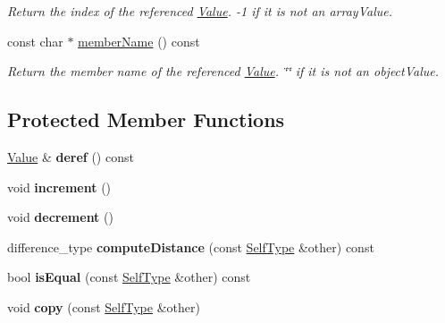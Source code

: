 \begin{DoxyCompactItemize}
\begin{DoxyCompactList}\small\item\em Return the index of the referenced \hyperlink{class_json_1_1_value}{Value}. -\/1 if it is not an array\-Value. \end{DoxyCompactList}\item 
\hypertarget{class_json_1_1_value_iterator_base_a83768d87c608c8d1133de8721eefc31b}{const char $\ast$ \hyperlink{class_json_1_1_value_iterator_base_a83768d87c608c8d1133de8721eefc31b}{member\-Name} () const }\label{class_json_1_1_value_iterator_base_a83768d87c608c8d1133de8721eefc31b}

\begin{DoxyCompactList}\small\item\em Return the member name of the referenced \hyperlink{class_json_1_1_value}{Value}. \char`\"{}\char`\"{} if it is not an object\-Value. \end{DoxyCompactList}\end{DoxyCompactItemize}
\subsection*{Protected Member Functions}
\begin{DoxyCompactItemize}
\item 
\hypertarget{class_json_1_1_value_iterator_base_a40a20c65abc423a26e3aae68d9a0525c}{\hyperlink{class_json_1_1_value}{Value} \& {\bfseries deref} () const }\label{class_json_1_1_value_iterator_base_a40a20c65abc423a26e3aae68d9a0525c}

\item 
\hypertarget{class_json_1_1_value_iterator_base_afe58f9534e1fd2033419fd9fe244551e}{void {\bfseries increment} ()}\label{class_json_1_1_value_iterator_base_afe58f9534e1fd2033419fd9fe244551e}

\item 
\hypertarget{class_json_1_1_value_iterator_base_affc8cf5ff54a9f432cc693362c153fa6}{void {\bfseries decrement} ()}\label{class_json_1_1_value_iterator_base_affc8cf5ff54a9f432cc693362c153fa6}

\item 
\hypertarget{class_json_1_1_value_iterator_base_ad6c553b249e89e3dc9933e100ccbe064}{difference\-\_\-type {\bfseries compute\-Distance} (const \hyperlink{class_json_1_1_value_iterator_base}{Self\-Type} \&other) const }\label{class_json_1_1_value_iterator_base_ad6c553b249e89e3dc9933e100ccbe064}

\item 
\hypertarget{class_json_1_1_value_iterator_base_a21820d6ee564e541bd118b21e4741962}{bool {\bfseries is\-Equal} (const \hyperlink{class_json_1_1_value_iterator_base}{Self\-Type} \&other) const }\label{class_json_1_1_value_iterator_base_a21820d6ee564e541bd118b21e4741962}

\item 
\hypertarget{class_json_1_1_value_iterator_base_a496e6aba44808433ec5858c178be5719}{void {\bfseries copy} (const \hyperlink{class_json_1_1_value_iterator_base}{Self\-Type} \&other)}\label{class_json_1_1_value_iterator_base_a496e6aba44808433ec5858c178be5719}

\end{DoxyCompactItemize}
